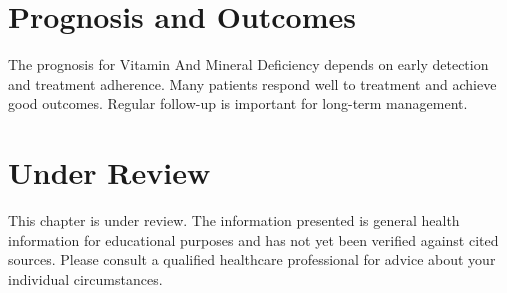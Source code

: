 \section*{Prognosis and Outcomes}
The prognosis for Vitamin And Mineral Deficiency depends on early detection and treatment adherence. Many patients respond well to treatment and achieve good outcomes. Regular follow-up is important for long-term management.
\section*{Under Review}
This chapter is under review. The information presented is general health information for educational purposes and has not yet been verified against cited sources. Please consult a qualified healthcare professional for advice about your individual circumstances.


\clearpage
